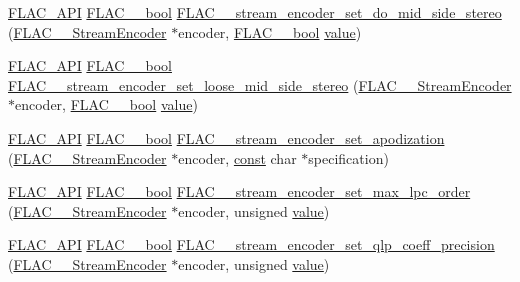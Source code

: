 \begin{DoxyCompactItemize}
\item 
\hyperlink{group__flac__export_ga56ca07df8a23310707732b1c0007d6f5}{F\+L\+A\+C\+\_\+\+A\+PI} \hyperlink{ordinals_8h_a95103469f1cbd78b8cf250194985b34e}{F\+L\+A\+C\+\_\+\+\_\+bool} \hyperlink{group__flac__stream__encoder_gadbd1084da109cf0ddd007a5c64027504}{F\+L\+A\+C\+\_\+\+\_\+stream\+\_\+encoder\+\_\+set\+\_\+do\+\_\+mid\+\_\+side\+\_\+stereo} (\hyperlink{struct_f_l_a_c_____stream_encoder}{F\+L\+A\+C\+\_\+\+\_\+\+Stream\+Encoder} $\ast$encoder, \hyperlink{ordinals_8h_a95103469f1cbd78b8cf250194985b34e}{F\+L\+A\+C\+\_\+\+\_\+bool} \hyperlink{lib_2expat_8h_a4a30a13b813682e68c5b689b45c65971}{value})
\item 
\hyperlink{group__flac__export_ga56ca07df8a23310707732b1c0007d6f5}{F\+L\+A\+C\+\_\+\+A\+PI} \hyperlink{ordinals_8h_a95103469f1cbd78b8cf250194985b34e}{F\+L\+A\+C\+\_\+\+\_\+bool} \hyperlink{group__flac__stream__encoder_ga7b7d294dccd5df7c6c67e75f59798f48}{F\+L\+A\+C\+\_\+\+\_\+stream\+\_\+encoder\+\_\+set\+\_\+loose\+\_\+mid\+\_\+side\+\_\+stereo} (\hyperlink{struct_f_l_a_c_____stream_encoder}{F\+L\+A\+C\+\_\+\+\_\+\+Stream\+Encoder} $\ast$encoder, \hyperlink{ordinals_8h_a95103469f1cbd78b8cf250194985b34e}{F\+L\+A\+C\+\_\+\+\_\+bool} \hyperlink{lib_2expat_8h_a4a30a13b813682e68c5b689b45c65971}{value})
\item 
\hyperlink{group__flac__export_ga56ca07df8a23310707732b1c0007d6f5}{F\+L\+A\+C\+\_\+\+A\+PI} \hyperlink{ordinals_8h_a95103469f1cbd78b8cf250194985b34e}{F\+L\+A\+C\+\_\+\+\_\+bool} \hyperlink{group__flac__stream__encoder_ga83d38fd6fca7abbf8363bdc2536a299e}{F\+L\+A\+C\+\_\+\+\_\+stream\+\_\+encoder\+\_\+set\+\_\+apodization} (\hyperlink{struct_f_l_a_c_____stream_encoder}{F\+L\+A\+C\+\_\+\+\_\+\+Stream\+Encoder} $\ast$encoder, \hyperlink{getopt1_8c_a2c212835823e3c54a8ab6d95c652660e}{const} char $\ast$specification)
\item 
\hyperlink{group__flac__export_ga56ca07df8a23310707732b1c0007d6f5}{F\+L\+A\+C\+\_\+\+A\+PI} \hyperlink{ordinals_8h_a95103469f1cbd78b8cf250194985b34e}{F\+L\+A\+C\+\_\+\+\_\+bool} \hyperlink{group__flac__stream__encoder_gac3bde5abdaa340674c5659e2e85d2611}{F\+L\+A\+C\+\_\+\+\_\+stream\+\_\+encoder\+\_\+set\+\_\+max\+\_\+lpc\+\_\+order} (\hyperlink{struct_f_l_a_c_____stream_encoder}{F\+L\+A\+C\+\_\+\+\_\+\+Stream\+Encoder} $\ast$encoder, unsigned \hyperlink{lib_2expat_8h_a4a30a13b813682e68c5b689b45c65971}{value})
\item 
\hyperlink{group__flac__export_ga56ca07df8a23310707732b1c0007d6f5}{F\+L\+A\+C\+\_\+\+A\+PI} \hyperlink{ordinals_8h_a95103469f1cbd78b8cf250194985b34e}{F\+L\+A\+C\+\_\+\+\_\+bool} \hyperlink{group__flac__stream__encoder_ga0888d739c952ff73456bf90e48634514}{F\+L\+A\+C\+\_\+\+\_\+stream\+\_\+encoder\+\_\+set\+\_\+qlp\+\_\+coeff\+\_\+precision} (\hyperlink{struct_f_l_a_c_____stream_encoder}{F\+L\+A\+C\+\_\+\+\_\+\+Stream\+Encoder} $\ast$encoder, unsigned \hyperlink{lib_2expat_8h_a4a30a13b813682e68c5b689b45c65971}{value})

\end{DoxyCompactItemize}
